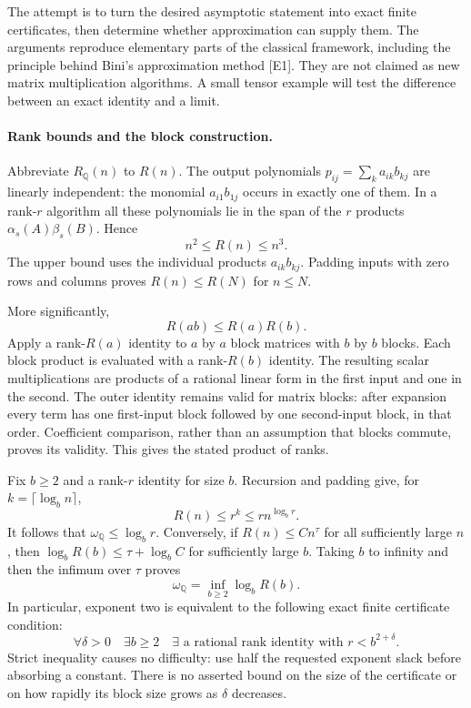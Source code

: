 \documentclass[11pt]{article}
\begin{document}
The attempt is to turn the desired asymptotic statement into exact finite
certificates, then determine whether approximation can supply them.
The arguments reproduce elementary parts of the classical framework,
including the principle behind Bini's approximation method [E1]. They
are not claimed as new matrix multiplication algorithms. A small tensor
example will test the difference between an exact identity and a limit.

\paragraph{Rank bounds and the block construction.}
Abbreviate $R_{\mathbb Q}(n)$ to $R(n)$. The output polynomials
$p_{ij}=\sum_k a_{ik}b_{kj}$ are linearly independent: the monomial
$a_{i1}b_{1j}$ occurs in exactly one of them. In a rank-$r$ algorithm
all these polynomials lie in the span of the $r$ products
$\alpha_s(A)\beta_s(B)$. Hence
\begin{equation}\label{mm:elementary}
 n^2\le R(n)\le n^3.
\end{equation}
The upper bound uses the individual products $a_{ik}b_{kj}$.
Padding inputs with zero rows and columns proves $R(n)\le R(N)$ for
$n\le N$.

More significantly,
\begin{equation}\label{mm:submult}
 R(ab)\le R(a)R(b).
\end{equation}
Apply a rank-$R(a)$ identity to $a$ by $a$ block matrices with $b$ by
$b$ blocks. Each block product is evaluated with a rank-$R(b)$ identity.
The resulting scalar multiplications are products of a rational linear
form in the first input and one in the second. The outer identity remains
valid for matrix blocks: after expansion every term has one first-input
block followed by one second-input block, in that order. Coefficient
comparison, rather than an assumption that blocks commute, proves its
validity. This gives the stated product of ranks.

Fix $b\ge2$ and a rank-$r$ identity for size $b$. Recursion and padding
give, for $k=\lceil\log_b n\rceil$,
\[
 R(n)\le r^k\le r n^{\log_b r}.
\]
It follows that $\omega_{\mathbb Q}\le\log_b r$. Conversely, if
$R(n)\le Cn^\tau$ for all sufficiently large $n$, then
$\log_bR(b)\le\tau+\log_b C$ for sufficiently large $b$.
Taking $b$ to infinity and then the infimum over $\tau$ proves
\begin{equation}\label{mm:finite}
 \omega_{\mathbb Q}=\inf_{b\ge2}\log_b R(b).
\end{equation}
In particular, exponent two is equivalent to the following exact finite
certificate condition:
\[
 \forall\delta>0\quad\exists b\ge2\quad
 \exists\text{ a rational rank identity with }r<b^{2+\delta}.
\]
Strict inequality causes no difficulty: use half the requested exponent
slack before absorbing a constant. There is no asserted bound on the
size of the certificate or on how rapidly its block size grows as
$\delta$ decreases.
\end{document}
